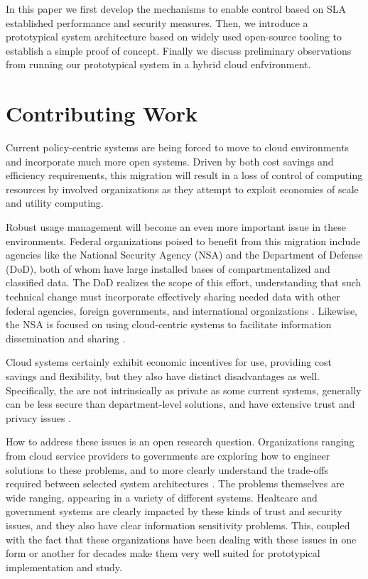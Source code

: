 \documentclass{acm_proc_article-sp}
\begin{document}
In this paper we first develop the mechanisms to enable control based on SLA established performance and security measures.  Then, we introduce a prototypical system architecture based on widely used open-source tooling to establish a simple proof of concept.  Finally we discuss preliminary observations from running our prototypical system in a hybrid cloud enfvironment.

\section{Contributing Work}\label{sec:motivation}
Current policy-centric systems are being forced to move to cloud environments and incorporate much more open systems.  Driven by both cost savings and efficiency requirements, this migration will result in a loss of control of computing resources by involved organizations as they attempt to exploit economies of scale and utility computing.

Robust usage management will become an even more important issue in these environments.  Federal organizations poised to benefit from this migration include agencies like the National Security Agency (NSA) and the Department of Defense (DoD), both of whom have large installed bases of compartmentalized and classified data.  The DoD realizes the scope of this effort, understanding that such technical change must incorporate effectively sharing needed data with other federal agencies, foreign governments, and international organizations \cite{proposal:info-sharing-strategy}.  Likewise, the NSA is focused on using cloud-centric systems to facilitate information dissemination and sharing \cite{proposal:nsa-cloud}.

Cloud systems certainly exhibit economic incentives for use, providing cost savings and flexibility, but they also have distinct disadvantages as well.  Specifically, the are not intrinsically as private as some current systems, generally can be less secure than department-level solutions, and have extensive trust and privacy issues \cite{proposal:privacy-security-trust-cloud}.

How to address these issues is an open research question.  Organizations ranging from cloud service providers to governments are exploring how to engineer solutions to these problems, and to more clearly understand the trade-offs required between selected system architectures \cite{proposal:assured-info-sharing}.  The problems themselves are wide ranging, appearing in a variety of different systems.  Healtcare and government systems are clearly impacted by these kinds of trust and security issues, and they also have clear information sensitivity problems.  This, coupled with the fact that these organizations have been dealing with these issues in one form or another for decades make them very well suited for prototypical implementation and study.
\end{document}
